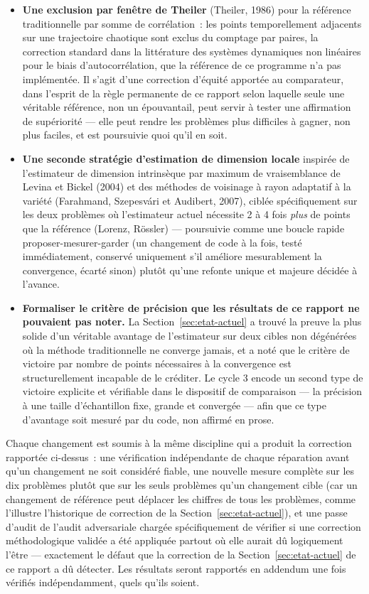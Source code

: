 \documentclass[11pt,a4paper]{article}
\begin{document}
\begin{itemize}
\item \textbf{Une exclusion par fenêtre de Theiler} (Theiler, 1986) pour
  la référence traditionnelle par somme de corrélation~: les points
  temporellement adjacents sur une trajectoire chaotique sont exclus du
  comptage par paires, la correction standard dans la littérature des
  systèmes dynamiques non linéaires pour le biais d'autocorrélation, que
  la référence de ce programme n'a pas implémentée. Il s'agit d'une
  correction d'équité apportée au comparateur, dans l'esprit de la règle
  permanente de ce rapport selon laquelle seule une véritable référence,
  non un épouvantail, peut servir à tester une affirmation de supériorité
  --- elle peut rendre les problèmes plus difficiles à gagner, non plus
  faciles, et est poursuivie quoi qu'il en soit.
\item \textbf{Une seconde stratégie d'estimation de dimension locale}
  inspirée de l'estimateur de dimension intrinsèque par maximum de
  vraisemblance de Levina et Bickel (2004) et des méthodes de voisinage à
  rayon adaptatif à la variété (Farahmand, Szepesv\'ari et Audibert, 2007),
  ciblée spécifiquement sur les deux problèmes où l'estimateur actuel
  nécessite 2 à 4 fois \emph{plus} de points que la référence (Lorenz,
  R\"ossler) --- poursuivie comme une boucle rapide proposer-mesurer-garder
  (un changement de code à la fois, testé immédiatement, conservé
  uniquement s'il améliore mesurablement la convergence, écarté sinon)
  plutôt qu'une refonte unique et majeure décidée à l'avance.
\item \textbf{Formaliser le critère de précision que les résultats de ce
  rapport ne pouvaient pas noter.} La Section~\ref{sec:etat-actuel} a
  trouvé la preuve la plus solide d'un véritable avantage de l'estimateur
  sur deux cibles non dégénérées où la méthode traditionnelle ne converge
  jamais, et a noté que le critère de victoire par nombre de points
  nécessaires à la convergence est structurellement incapable de le
  créditer. Le cycle 3 encode un second type de victoire explicite et
  vérifiable dans le dispositif de comparaison --- la précision à une
  taille d'échantillon fixe, grande et convergée --- afin que ce type
  d'avantage soit mesuré par du code, non affirmé en prose.
\end{itemize}

Chaque changement est soumis à la même discipline qui a produit la
correction rapportée ci-dessus~: une vérification indépendante de chaque
réparation avant qu'un changement ne soit considéré fiable, une nouvelle
mesure complète sur les dix problèmes plutôt que sur les seuls problèmes
qu'un changement cible (car un changement de référence peut déplacer les
chiffres de tous les problèmes, comme l'illustre l'historique de
correction de la Section~\ref{sec:etat-actuel}), et une passe d'audit de
l'audit adversariale chargée spécifiquement de vérifier si une correction
méthodologique validée a été appliquée partout où elle aurait dû
logiquement l'être --- exactement le défaut que la correction de la
Section~\ref{sec:etat-actuel} de ce rapport a dû détecter. Les résultats
seront rapportés en addendum une fois vérifiés indépendamment, quels
qu'ils soient.
\end{document}
